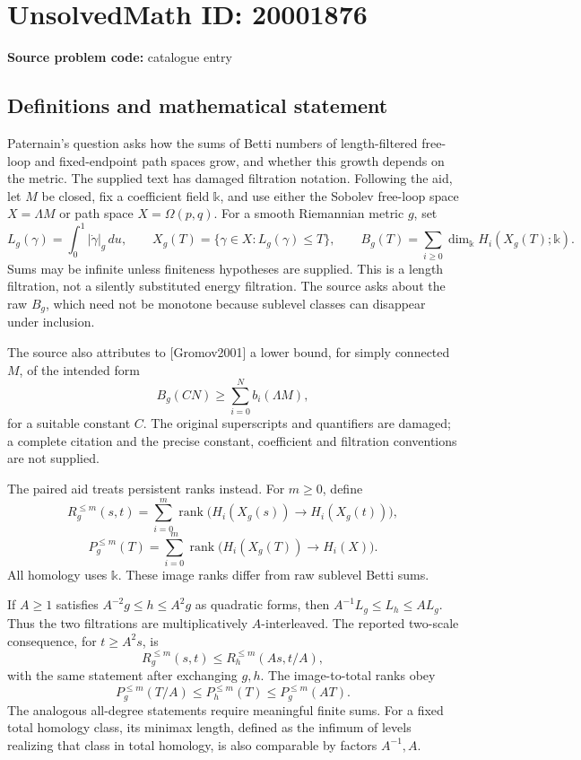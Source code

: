 \documentclass[11pt]{article}
\begin{document}
\section*{UnsolvedMath ID: 20001876}
\textbf{Source problem code:} catalogue entry
\subsection{Definitions and mathematical statement}
Paternain's question asks how the sums of Betti numbers of length-filtered free-loop and fixed-endpoint path spaces grow, and whether this growth depends on the metric. The supplied text has damaged filtration notation. Following the aid, let \(M\) be closed, fix a coefficient field \(\mathbb k\), and use either the Sobolev free-loop space \(X=\Lambda M\) or path space \(X=\Omega(p,q)\). For a smooth Riemannian metric \(g\), set
\[
 L_g(\gamma)=\int_0^1|\dot\gamma|_g\,du,\qquad
 X_g(T)=\{\gamma\in X:L_g(\gamma)\leq T\},\qquad
 B_g(T)=\sum_{i\geq0}\dim_{\mathbb k}H_i(X_g(T);\mathbb k).
\]
Sums may be infinite unless finiteness hypotheses are supplied. This is a length filtration, not a silently substituted energy filtration. The source asks about the raw \(B_g\), which need not be monotone because sublevel classes can disappear under inclusion.

The source also attributes to [Gromov2001] a lower bound, for simply connected \(M\), of the intended form
\[
 B_g(CN)\geq\sum_{i=0}^N b_i(\Lambda M),
\]
for a suitable constant \(C\). The original superscripts and quantifiers are damaged; a complete citation and the precise constant, coefficient and filtration conventions are not supplied.

The paired aid treats persistent ranks instead. For \(m\geq0\), define
\[
 R_g^{\leq m}(s,t)=\sum_{i=0}^m
 \operatorname{rank}\bigl(H_i(X_g(s))\to H_i(X_g(t))\bigr),
\]
\[
 P_g^{\leq m}(T)=\sum_{i=0}^m
 \operatorname{rank}\bigl(H_i(X_g(T))\to H_i(X)\bigr).
\]
All homology uses \(\mathbb k\). These image ranks differ from raw sublevel Betti sums.

If \(A\geq1\) satisfies \(A^{-2}g\leq h\leq A^2g\) as quadratic forms, then \(A^{-1}L_g\leq L_h\leq AL_g\). Thus the two filtrations are multiplicatively \(A\)-interleaved. The reported two-scale consequence, for \(t\geq A^2s\), is
\[
 R_g^{\leq m}(s,t)\leq R_h^{\leq m}(As,t/A),
\]
with the same statement after exchanging \(g,h\). The image-to-total ranks obey
\[
 P_g^{\leq m}(T/A)\leq P_h^{\leq m}(T)\leq P_g^{\leq m}(AT).
\]
The analogous all-degree statements require meaningful finite sums. For a fixed total homology class, its minimax length, defined as the infimum of levels realizing that class in total homology, is also comparable by factors \(A^{-1},A\).
\end{document}
